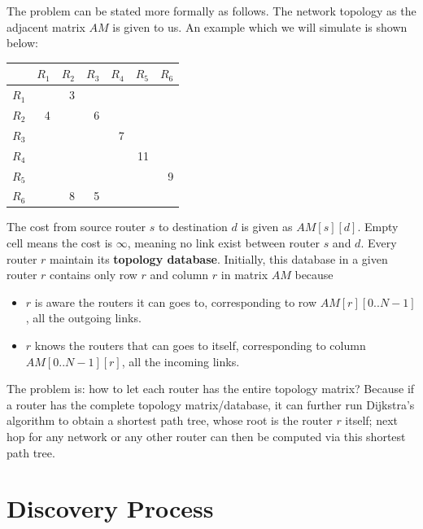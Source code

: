 \documentclass[12pt]{article}  %
\theoremstyle{definition}
\theoremstyle{remark}
\begin{document}
The problem can be stated more formally as follows. The network topology as the adjacent matrix $AM$ is given to us.
An example which we will simulate is shown below:
\begin{center}
\begin{tabular}{|r|r|r|r|r|r|r|}        %
\hline                                  %
 & $R_1$ & $R_2$ & $R_3$ & $R_4$ & $R_5$ & $R_6$ \\ %
\hline
$R_1$ &   & 3 &   &   &    & \\
\hline
$R_2$ & 4 &   & 6 &   &    & \\
\hline
$R_3$ &   &   &   & 7 &    & \\
\hline
$R_4$ &   &   &   &   & 11 & \\
\hline
$R_5$ &   &   &   &   &    & 9 \\
\hline
$R_6$ &   & 8 & 5 &   &    & \\
\hline
\end{tabular}
\end{center}
The cost from source router $s$ to destination $d$ is given as $AM[s][d]$.
Empty cell means the cost is $\infty$, meaning no link exist between router $s$ and $d$.
Every router $r$ maintain its \textbf{topology database}.
Initially, this database in a given router $r$ contains only row $r$ and column $r$ in matrix $AM$ because
\begin{itemize}
        \item $r$ is aware the routers it can goes to, corresponding to row $AM[r][0..N-1]$, all the outgoing links.
        \item $r$ knows the routers that can goes to itself, corresponding to column $AM[0..N-1][r]$, all the incoming links.
\end{itemize}
The problem is: how to let each router has the entire topology matrix?
Because if a router has the complete topology matrix/database, it can further run Dijkstra's algorithm to obtain a shortest path tree, whose root is the router $r$ itself;
next hop for any network or any other router can then be computed via this shortest path tree.

\section{Discovery Process}
\end{document}
